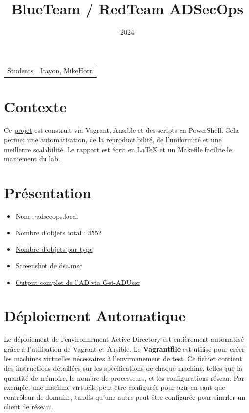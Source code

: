 \documentclass{article}
\title{BlueTeam / RedTeam ADSecOps}
\date{2024}
\begin{document}
\maketitle

\noindent\begin{tabular}{@{}ll}
    Students & Itayon, MikeHorn
\end{tabular}

\section*{Contexte}
Ce \href{https://github.com/MikeHorn-git/ADSecOps}{projet} est construit via Vagrant, Ansible et des scripts en PowerShell. Cela permet une automatisation, de la reproductibilité, de l'uniformité et une meilleure scalabilité. Le rapport est écrit en LaTeX et un Makefile facilite le maniement du lab.

\section{Présentation}
\begin{itemize}
    \item Nom : adsecops.local
    \item Nombre d'objets total : 3552
    \item \href{https://github.com/MikeHorn-git/ADSecOps/assets/text/objects-number.txt}{Nombre d'objets par type}
    \item \href{https://github.com/MikeHorn-git/ADSecOps/assets/picture/dsa.png}{Screenshot} de dsa.msc
    \item \href{https://github.com/MikeHorn-git/ADSecOps/assets/text/get-aduser.txt}{Output complet de l'AD via Get-ADUser}
\end{itemize}

\section{Déploiement Automatique}
Le déploiement de l'environnement Active Directory est entièrement automatisé grâce à l'utilisation de Vagrant et Ansible. Le \textbf{Vagrantfile} est utilisé pour créer les machines virtuelles nécessaires à l'environnement de test. Ce fichier contient des instructions détaillées sur les spécifications de chaque machine, telles que la quantité de mémoire, le nombre de processeurs, et les configurations réseau. Par exemple, une machine virtuelle peut être configurée pour agir en tant que contrôleur de domaine, tandis qu'une autre peut être configurée pour simuler un client de réseau.
\end{document}
